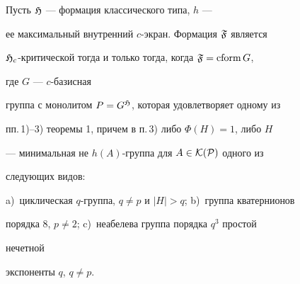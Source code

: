 \begin{cor} 


Пусть $\frak H$ --- формация классического типа, $h$ --- 


ее максимальный внутренний $c$-экран. Формация $\frak F$ является 


$\frak H_c$-критической тогда и только тогда, когда $\frak F=\operatorname{cform} G$, 


где $G$ --- $c$-базисная 


группа с монолитом $P=G^{\frak H}$, которая удовлетворяет одному из 


пп.\,1)--3) теоремы 1, причем в п.\,3) либо $\Phi(H)=1$, либо $H$ 


--- минимальная не $h(A)$-группа для $A\in\cal K(P)$ одного из 


следующих видов: 


a)~циклическая $q$-группа, $q\ne p$ и $|H|>q$; b)~группа кватернионов 


порядка $8$, $p\ne2$; c)~неабелева группа порядка $q^3$ простой 


нечетной 


экспоненты $q$, $q\ne p$. 


\end{cor} 


 



